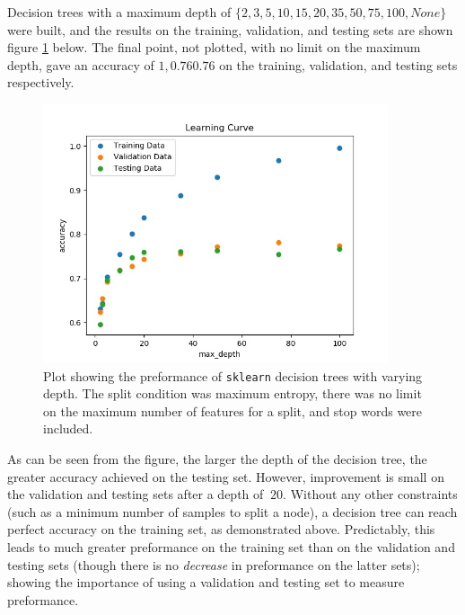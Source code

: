 \documentclass{article}
\begin{document}
   Decision trees with a maximum depth of $\{ 2, 3, 5, 10, 15, 20, 35, 50, 75, 100, None \}$ were built, and
   the results on the training, validation, and testing sets are shown figure \ref{part7a} below. The final point,
   not plotted, with no limit on the maximum depth, gave an accuracy of $1, 0.76 0.76$ on the training,
   validation, and testing sets respectively.
      \begin{figure}[h] \centering
         \includegraphics[width=4in]{resources/part7/part7a_splitCondition=entropy_maxFeatures=None_stopWords=True}

         \caption{Plot showing the preformance of \texttt{sklearn} decision trees with
            varying depth. The split condition was maximum entropy, there was no limit on the maximum
            number of features for a split, and stop words were included.}
         \label{part7a}
      \end{figure}
   As can be seen from the figure, the larger the depth of the decision tree, the greater accuracy achieved on
   the testing set. However, improvement is small on the validation and testing sets after a depth of
   $~20$. Without any other constraints (such as a minimum number of samples to split a node), a decision tree
   can reach perfect accuracy on the training set, as demonstrated above. Predictably, this leads to
   much greater preformance on the training set than on the validation and testing sets (though there is no
   \textit{decrease} in preformance on the latter sets); showing the importance of using a validation and testing
   set to measure preformance.
\end{document}
